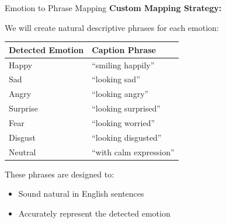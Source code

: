 \documentclass{beamer}
\begin{document}
\begin{frame}{Emotion to Phrase Mapping}
    \textbf{Custom Mapping Strategy:}
    
    \vspace{0.5cm}
    We will create natural descriptive phrases for each emotion:
    
    \vspace{0.5cm}
    \begin{center}
    \begin{tabular}{|l|l|}
    \hline
    \textbf{Detected Emotion} & \textbf{Caption Phrase} \\
    \hline
    Happy & ``smiling happily'' \\
    Sad & ``looking sad'' \\
    Angry & ``looking angry'' \\
    Surprise & ``looking surprised'' \\
    Fear & ``looking worried'' \\
    Disgust & ``looking disgusted'' \\
    Neutral & ``with calm expression'' \\
    \hline
    \end{tabular}
    \end{center}
    
    \vspace{0.5cm}
    These phrases are designed to:
    \begin{itemize}
        \item Sound natural in English sentences
        \item Accurately represent the detected emotion
    \end{itemize}
\end{frame}
\end{document}
